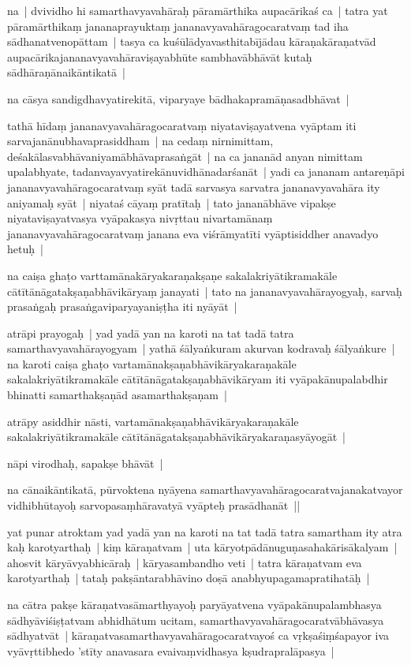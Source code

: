 \documentclass[article,12pt,a4paper]{memoir}
\begin{document}
	  \pstart na | dvividho hi samarthavyavahāraḥ pāramārthika aupacārikaś ca | tatra yat pāramārthikaṃ jananaprayuktaṃ jananavyavahāragocaratvaṃ tad iha sādhanatvenopāttam | tasya ca kuśūlādyavasthitabījādau kāraṇakāraṇatvād aupacārikajananavyavahāraviṣayabhūte sambhavābhāvāt kutaḥ sādhāraṇānaikāntikatā | 
	\pend
      

	  \pstart na cāsya sandigdhavyatirekitā, viparyaye bādhakapramāṇasadbhāvat | 
	\pend
      

	  \pstart tathā hīdaṃ jananavyavahāragocaratvaṃ niyataviṣayatvena vyāptam iti sarvajanānubhavaprasiddham | na cedaṃ nirnimittam, deśakālasvabhāvaniyamābhāvaprasaṅgāt | na ca jananād anyan nimittam upalabhyate, tadanvayavyatirekānuvidhānadarśanāt | yadi ca jananam antareṇāpi jananavyavahāragocaratvaṃ syāt tadā sarvasya sarvatra jananavyavahāra ity aniyamaḥ syāt | niyataś cāyaṃ pratītaḥ | tato jananābhāve vipakṣe niyataviṣayatvasya vyāpakasya nivṛttau nivartamānaṃ jananavyavahāragocaratvaṃ janana eva viśrāmyatīti vyāptisiddher anavadyo hetuḥ |
	\pend
      

	  \pstart na caiṣa ghaṭo varttamānakāryakaraṇakṣaṇe sakalakriyātikramakāle cātītānāgatakṣaṇabhāvikāryaṃ janayati | tato na jananavyavahārayogyaḥ, sarvaḥ prasaṅgaḥ prasaṅgaviparyayaniṣṭha iti nyāyāt |
	\pend
      

	  \pstart atrāpi prayogaḥ | yad yadā yan na karoti na tat tadā tatra samarthavyavahārayogyam | yathā śālyaṅkuram akurvan kodravaḥ śālyaṅkure | na karoti caiṣa ghaṭo vartamānakṣaṇabhāvikāryakaraṇakāle sakalakriyātikramakāle cātītānāgatakṣaṇabhāvikāryam iti vyāpakānupalabdhir bhinatti samarthakṣaṇād asamarthakṣaṇam |
	\pend
      

	  \pstart atrāpy asiddhir nāsti, vartamānakṣaṇabhāvikāryakaraṇakāle sakalakriyātikramakāle cātītānāgatakṣaṇabhāvikāryakaraṇasyāyogāt |
	\pend
      

	  \pstart nāpi virodhaḥ, sapakṣe bhāvāt |
	\pend
      

	  \pstart na cānaikāntikatā, pūrvoktena nyāyena samarthavyavahāragocaratvajanakatvayor vidhibhūtayoḥ sarvopasaṃhāravatyā vyāpteḥ prasādhanāt ||
	\pend
      

	  \pstart yat punar atroktam yad yadā yan na karoti na tat tadā tatra samartham ity atra kaḥ karotyarthaḥ | kiṃ kāraṇatvam | uta kāryotpādānuguṇasahakārisākalyam | ahosvit kāryāvyabhicāraḥ | kāryasambandho veti | tatra kāraṇatvam eva karotyarthaḥ | tataḥ pakṣāntarabhāvino doṣā anabhyupagamapratihatāḥ |
	\pend
      

	  \pstart na cātra pakṣe kāraṇatvasāmarthyayoḥ paryāyatvena vyāpakānupalambhasya sādhyāviśiṣṭatvam abhidhātum ucitam, samarthavyavahāragocaratvābhāvasya sādhyatvāt | kāraṇatvasamarthavyavahāragocaratvayoś ca vṛkṣaśiṃśapayor iva vyāvṛttibhedo 'stīty anavasara evaivaṃvidhasya kṣudrapralāpasya |
	\pend
      
\end{document}

